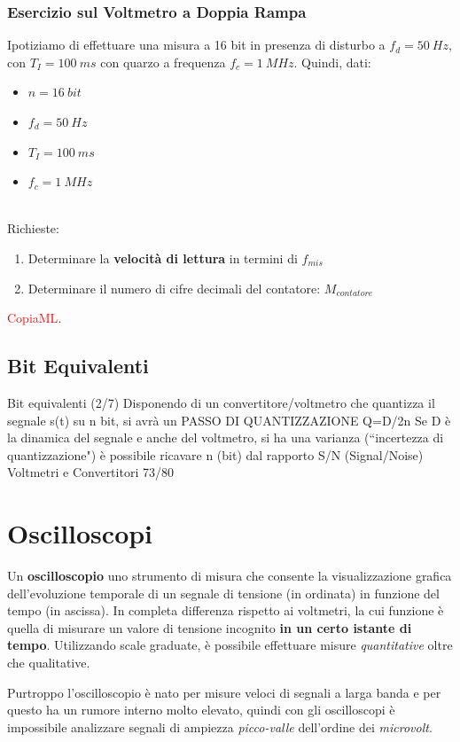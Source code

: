 \documentclass[a4paper,11pt]{report}
\begin{document}
\subsection{Esercizio sul Voltmetro a Doppia Rampa}
Ipotiziamo di effettuare una misura a 16 bit in presenza di disturbo a $ f_d = 50~Hz $, con $ T_I = 100~ms $ con quarzo a frequenza $ f_c = 1~MHz $.
Quindi, dati:
\begin{itemize}
  \item $ n = 16~bit $
  \item $ f_d = 50~Hz $
  \item $ T_I = 100~ms $
  \item $ f_c = 1~MHz $
\end{itemize}~\\
Richieste:
\begin{enumerate}
  \item Determinare la \textbf{velocità di lettura} in termini di $ f_{mis} $
  \item Determinare il numero di cifre decimali del contatore: $ M_{contatore} $
\end{enumerate}

\textcolor{red}{CopiaML}.

\section{Bit Equivalenti}

Bit equivalenti (2/7) Disponendo di un convertitore/voltmetro che quantizza il segnale s(t) su n bit, si avrà un PASSO DI QUANTIZZAZIONE Q=D/2n Se D è la dinamica del segnale e anche del voltmetro, si ha una varianza (“incertezza di quantizzazione") è possibile ricavare n (bit) dal rapporto S/N (Signal/Noise) Voltmetri e Convertitori 73/80

\chapter{Oscilloscopi}
Un \textbf{oscilloscopio} uno strumento di misura che consente la visualizzazione grafica dell'evoluzione temporale di un segnale di tensione (in ordinata) in funzione del tempo (in ascissa). In completa differenza rispetto ai voltmetri, la cui funzione è quella di misurare un valore di tensione incognito \textbf{in un certo istante di tempo}. Utilizzando scale graduate, è possibile effettuare misure \textit{quantitative} oltre che qualitative.

Purtroppo l'oscilloscopio è nato per misure veloci di segnali a larga banda e per questo ha un rumore interno molto elevato, quindi con gli oscilloscopi è impossibile analizzare segnali di ampiezza \textit{picco-valle} dell'ordine dei \textit{microvolt}.
\end{document}
